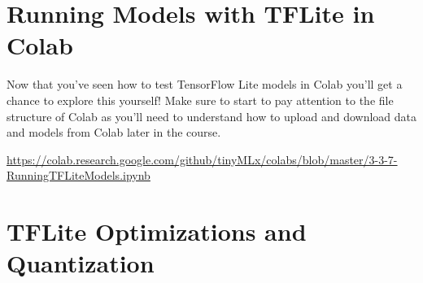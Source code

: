 \section{Running Models with TFLite in Colab}

Now that you’ve seen how to test TensorFlow Lite models in Colab you’ll get a chance to explore this yourself! Make sure to start to pay attention to the file structure of Colab as you’ll need to understand how to upload and download data and models from Colab later in the course.

\url{https://colab.research.google.com/github/tinyMLx/colabs/blob/master/3-3-7-RunningTFLiteModels.ipynb}

\section{TFLite Optimizations and Quantization}


